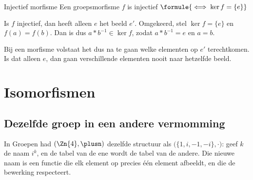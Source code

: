 \begin{theorie}
\begin{stelling}{Injectief morfisme}
Een groepsmorfisme $f$ is injectief \qquad $\formule{\iff \ker f = \{e\}}$
\end{stelling}

\begin{bewijs}
Is $f$ injectief, dan heeft alleen $e$ het beeld $e'$. Omgekeerd, stel $\ker f = \{e\}$ en $f(a) = f(b)$. Dan is
dus $a \ast b^{-1} \in \ker f$, zodat $a \ast b^{-1} = e$ en $a = b$.
\end{bewijs}
\end{theorie}

Bij een morfisme volstaat het dus na te gaan welke elementen op $e'$ terechtkomen. Is dat alleen $e$, dan gaan verschillende elementen nooit naar hetzelfde beeld.


\begin{oefeningen}
\end{oefeningen}

\section{Isomorfismen}

\subsection{Dezelfde groep in een andere vermomming}

In Groepen had $(\Zn{4}, \plusn)$ dezelfde structuur als $\bigl(\{1, i, -1, -i\}, \cdot\bigr)$: geef $k$ de naam $i^k$, en de tabel van de ene wordt de tabel van de andere. Die nieuwe naam is een functie die elk element op precies één element afbeeldt, en die de bewerking respecteert.

